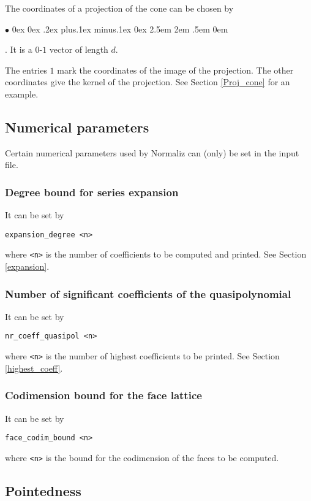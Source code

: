 \documentclass[12pt,a4paper]{scrartcl}
\newcommand{\stdli}{ \topsep0ex \partopsep0ex %
\parsep.2ex plus.1ex minus.1ex \itemsep0ex%
\leftmargin2.5em \labelwidth2em \labelsep.5em \rightmargin0em}%
\renewenvironment{itemize}{\begin{list}{{$\bullet$}}{\stdli}}{\end{list}}
\theoremstyle{definition}
\def\itemtt[#1]{\item[\textbf{\ttt{#1}}]}
\def\ttt{\texttt}
\begin{document}
The coordinates of a projection of the cone can be chosen by
\begin{itemize}
	\itemtt[projection\_coordinates]. It is a $0$-$1$ vector of length $d$.
\end{itemize}
The entries $1$ mark the coordinates of the image of the projection. The other coordinates give the kernel of the projection. See Section \ref{Proj_cone} for an example.

\subsection{Numerical parameters}

Certain numerical parameters used by Normaliz can (only) be set in the input file. 

\subsubsection{Degree bound for series expansion}

It can be set by
\begin{Verbatim}
expansion_degree <n>
\end{Verbatim}
where \verb|<n>| is the number of coefficients to be computed and printed. See Section \ref{expansion}.

\subsubsection{Number of significant coefficients of the quasipolynomial}

It can be set by
\begin{Verbatim}
nr_coeff_quasipol <n>
\end{Verbatim}
where \verb|<n>| is the number of highest coefficients to be printed. See Section \ref{highest_coeff}.

\subsubsection{Codimension bound for the face lattice}

It can be set by
\begin{Verbatim}
face_codim_bound <n>
\end{Verbatim}
where \verb|<n>| is the bound for the codimension of the faces to be computed.


\subsection{Pointedness}
\end{document}
